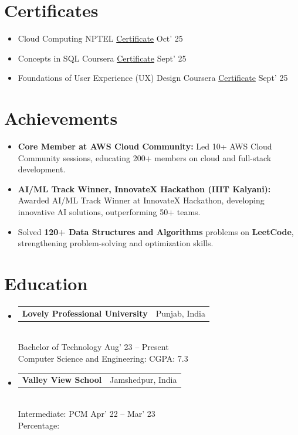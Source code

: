 \documentclass[10pt, a4paper]{article}
\makeatletter
\newcommand{\instituterow}[2]{%
  \noindent\begin{tabularx}{\linewidth}{@{}X@{\hspace{4pt}}r@{}}
    {\color{headingblue}\bfseries\fontsize{10pt}{12pt}\selectfont #1} &
    {\fontsize{8.5pt}{10pt}\selectfont #2}
  \end{tabularx}%
}
\makeatother
\begin{document}
\section{Certificates}

\begin{itemize}[itemsep=5pt]
  \item Cloud Computing \textbar{} NPTEL \textbar{} \href{https://github.com/G4uravXDev}{\textcolor{linknavy}{Certificate}}
        \hfill {\fontsize{8.5pt}{10pt}\selectfont Oct' 25}
  \item Concepts in SQL \textbar{} Coursera \textbar{} \href{https://github.com/G4uravXDev}{\textcolor{linknavy}{Certificate}}
        \hfill {\fontsize{8.5pt}{10pt}\selectfont Sept' 25}
  \item Foundations of User Experience (UX) Design \textbar{} Coursera \textbar{} \href{https://github.com/G4uravXDev}{\textcolor{linknavy}{Certificate}}
        \hfill {\fontsize{8.5pt}{10pt}\selectfont Sept' 25}
\end{itemize}

\section{Achievements}

\begin{itemize}
  \item \textbf{Core Member at AWS Cloud Community:} Led 10+ AWS Cloud Community sessions, educating 200+ members on cloud and full-stack development.
  \item \textbf{AI/ML Track Winner, InnovateX Hackathon (IIIT Kalyani):} Awarded AI/ML Track Winner at InnovateX Hackathon, developing innovative AI solutions, outperforming 50+ teams.
  \item Solved \textbf{120+ Data Structures and Algorithms} problems on \textbf{LeetCode}, strengthening problem-solving and optimization skills.
\end{itemize}

\section{Education}
\vspace{4pt}
\begin{itemize}[itemsep=8pt]

  \item
    \instituterow{Lovely Professional University}{Punjab, India}\\[1pt]
    {\fontsize{8.5pt}{10pt}\selectfont Bachelor of Technology \hfill Aug' 23 -- Present}\\
    {\fontsize{8.5pt}{10pt}\selectfont Computer Science and Engineering: CGPA: 7.3}

  \item
    \instituterow{Valley View School}{Jamshedpur, India}\\[1pt]
    {\fontsize{8.5pt}{10pt}\selectfont Intermediate: PCM \hfill Apr' 22 -- Mar' 23}\\
    {\fontsize{8.5pt}{10pt}\selectfont Percentage:}

\end{itemize}
\end{document}
